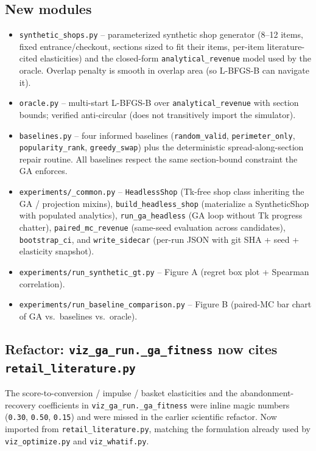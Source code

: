 \documentclass[11pt]{article}
\begin{document}
\subsection{New modules}
\begin{itemize}[leftmargin=*]
  \item \texttt{synthetic\_shops.py} -- parameterized synthetic shop
    generator (8--12 items, fixed entrance/checkout, sections sized
    to fit their items, per-item literature-cited elasticities) and
    the closed-form \texttt{analytical\_revenue} model used by the
    oracle. Overlap penalty is smooth in overlap area (so L-BFGS-B
    can navigate it).
  \item \texttt{oracle.py} -- multi-start L-BFGS-B over
    \texttt{analytical\_revenue} with section bounds; verified
    anti-circular (does not transitively import the simulator).
  \item \texttt{baselines.py} -- four informed baselines
    (\texttt{random\_valid}, \texttt{perimeter\_only},
    \texttt{popularity\_rank}, \texttt{greedy\_swap}) plus the
    deterministic spread-along-section repair routine. All baselines
    respect the same section-bound constraint the GA enforces.
  \item \texttt{experiments/\_common.py} -- \texttt{HeadlessShop}
    (Tk-free shop class inheriting the GA / projection mixins),
    \texttt{build\_headless\_shop} (materialize a SyntheticShop with
    populated analytics), \texttt{run\_ga\_headless} (GA loop
    without Tk progress chatter), \texttt{paired\_mc\_revenue}
    (same-seed evaluation across candidates),
    \texttt{bootstrap\_ci}, and \texttt{write\_sidecar} (per-run
    JSON with git SHA + seed + elasticity snapshot).
  \item \texttt{experiments/run\_synthetic\_gt.py} -- Figure A
    (regret box plot + Spearman correlation).
  \item \texttt{experiments/run\_baseline\_comparison.py} -- Figure B
    (paired-MC bar chart of GA vs.\ baselines vs.\ oracle).
\end{itemize}

\subsection{Refactor: \texttt{viz\_ga\_run.\_ga\_fitness} now cites
\texttt{retail\_literature.py}}
The score-to-conversion / impulse / basket elasticities and the
abandonment-recovery coefficients in
\texttt{viz\_ga\_run.\_ga\_fitness} were inline magic numbers
(\texttt{0.30}, \texttt{0.50}, \texttt{0.15}) and were missed in the
earlier scientific refactor. Now imported from
\texttt{retail\_literature.py}, matching the formulation already used
by \texttt{viz\_optimize.py} and \texttt{viz\_whatif.py}.
\end{document}
